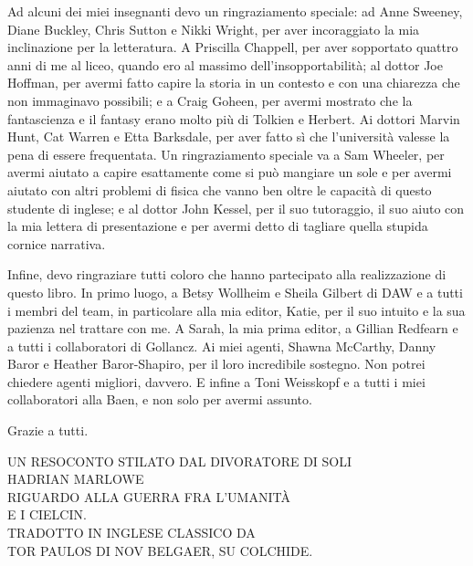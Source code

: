 {Ad alcuni dei miei insegnanti devo un ringraziamento speciale: ad Anne Sweeney, Diane Buckley, Chris Sutton e Nikki Wright, per aver incoraggiato la mia inclinazione per la letteratura. A Priscilla Chappell, per aver sopportato quattro anni di me al liceo, quando ero al massimo dell'insopportabilità; al dottor Joe Hoffman, per avermi fatto capire la storia in un contesto e con una chiarezza che non immaginavo possibili; e a Craig Goheen, per avermi mostrato che la fantascienza e il fantasy erano molto più di Tolkien e Herbert. Ai dottori Marvin Hunt, Cat Warren e Etta Barksdale, per aver fatto sì che l'università valesse la pena di essere frequentata. Un ringraziamento speciale va a Sam Wheeler, per avermi aiutato a capire esattamente come si può mangiare un sole e per avermi aiutato con altri problemi di fisica che vanno ben oltre le capacità di questo studente di inglese; e al dottor John Kessel, per il suo tutoraggio, il suo aiuto con la mia lettera di presentazione e per avermi detto di tagliare quella stupida cornice narrativa.

Infine, devo ringraziare tutti coloro che hanno partecipato alla realizzazione di questo libro. In primo luogo, a Betsy Wollheim e Sheila Gilbert di DAW e a tutti i membri del team, in particolare alla mia editor, Katie, per il suo intuito e la sua pazienza nel trattare con me. A Sarah, la mia prima editor, a Gillian Redfearn e a tutti i collaboratori di Gollancz. Ai miei agenti, Shawna McCarthy, Danny Baror e Heather Baror-Shapiro, per il loro incredibile sostegno. Non potrei chiedere agenti migliori, davvero. E infine a Toni Weisskopf e a tutti i miei collaboratori alla Baen, e non solo per avermi assunto.

Grazie a tutti.

}

\newpage

\setcounter{page}{0}

\begin{figure}
	\centering
	\def\svgwidth{\columnwidth}
	\scalebox{0.7}{}
\end{figure}

\begin{center}
	UN RESOCONTO STILATO DAL DIVORATORE DI SOLI\\
		HADRIAN MARLOWE\\
		RIGUARDO ALLA GUERRA FRA L’UMANITÀ\\
		E I CIELCIN.\\
		TRADOTTO IN INGLESE CLASSICO DA\\
		TOR PAULOS DI NOV BELGAER, SU COLCHIDE.
\end{center}

\newpage\blankpage
